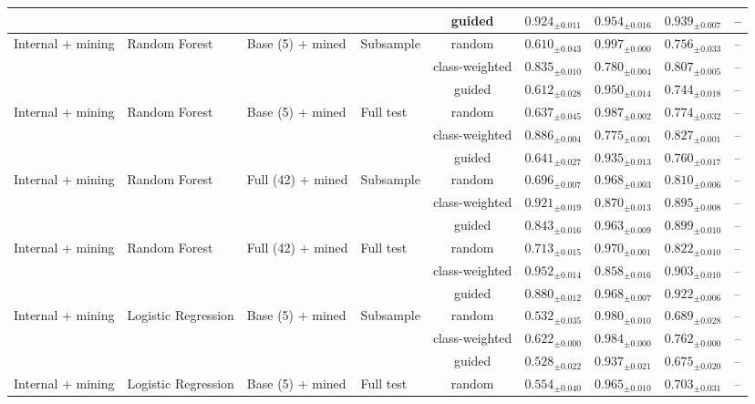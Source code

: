 \begin{longtable}{llllcccc}
 &  &  &  & guided & $0.924_{\pm 0.011}$ & $0.954_{\pm 0.016}$ & $0.939_{\pm 0.007}$ & -- \\
\midrule
Internal + mining & Random Forest & Base (5) + mined & Subsample & random & $0.610_{\pm 0.043}$ & $0.997_{\pm 0.000}$ & $0.756_{\pm 0.033}$ & -- \\
 &  &  &  & class-weighted & $0.835_{\pm 0.010}$ & $0.780_{\pm 0.004}$ & $0.807_{\pm 0.005}$ & -- \\
 &  &  &  & guided & $0.612_{\pm 0.028}$ & $0.950_{\pm 0.014}$ & $0.744_{\pm 0.018}$ & -- \\
\addlinespace
Internal + mining & Random Forest & Base (5) + mined & Full test & random & $0.637_{\pm 0.045}$ & $0.987_{\pm 0.002}$ & $0.774_{\pm 0.032}$ & -- \\
 &  &  &  & class-weighted & $0.886_{\pm 0.004}$ & $0.775_{\pm 0.001}$ & $0.827_{\pm 0.001}$ & -- \\
 &  &  &  & guided & $0.641_{\pm 0.027}$ & $0.935_{\pm 0.013}$ & $0.760_{\pm 0.017}$ & -- \\
\addlinespace
Internal + mining & Random Forest & Full (42) + mined & Subsample & random & $0.696_{\pm 0.007}$ & $0.968_{\pm 0.003}$ & $0.810_{\pm 0.006}$ & -- \\
 &  &  &  & class-weighted & $0.921_{\pm 0.019}$ & $0.870_{\pm 0.013}$ & $0.895_{\pm 0.008}$ & -- \\
 &  &  &  & guided & $0.843_{\pm 0.016}$ & $0.963_{\pm 0.009}$ & $0.899_{\pm 0.010}$ & -- \\
\addlinespace
Internal + mining & Random Forest & Full (42) + mined & Full test & random & $0.713_{\pm 0.015}$ & $0.970_{\pm 0.001}$ & $0.822_{\pm 0.010}$ & -- \\
 &  &  &  & class-weighted & $0.952_{\pm 0.014}$ & $0.858_{\pm 0.016}$ & $0.903_{\pm 0.010}$ & -- \\
 &  &  &  & guided & $0.880_{\pm 0.012}$ & $0.968_{\pm 0.007}$ & $0.922_{\pm 0.006}$ & -- \\
\addlinespace
Internal + mining & Logistic Regression & Base (5) + mined & Subsample & random & $0.532_{\pm 0.035}$ & $0.980_{\pm 0.010}$ & $0.689_{\pm 0.028}$ & -- \\
 &  &  &  & class-weighted & $0.622_{\pm 0.000}$ & $0.984_{\pm 0.000}$ & $0.762_{\pm 0.000}$ & -- \\
 &  &  &  & guided & $0.528_{\pm 0.022}$ & $0.937_{\pm 0.021}$ & $0.675_{\pm 0.020}$ & -- \\
\addlinespace
Internal + mining & Logistic Regression & Base (5) + mined & Full test & random & $0.554_{\pm 0.040}$ & $0.965_{\pm 0.010}$ & $0.703_{\pm 0.031}$ & -- \\

\end{longtable}
